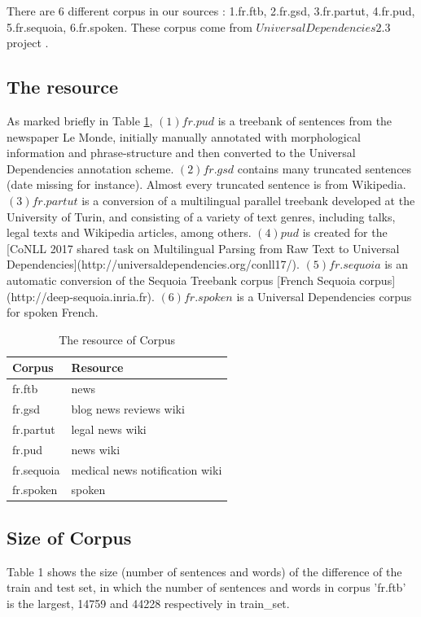 \documentclass{article}
\begin{document}
There are 6 different corpus in our sources : 1.fr.ftb, 2.fr.gsd, 3.fr.partut, 4.fr.pud, 5.fr.sequoia, 6.fr.spoken. These corpus come from $Universal Dependencies 2.3$ project \cite{nivre2017universal}. 

\subsection{The resource}
As marked briefly in Table \ref{table_resource}, $(1) fr.pud$  is a treebank of sentences from the newspaper Le Monde, initially manually annotated with morphological information and phrase-structure and then converted to the Universal Dependencies annotation scheme. $(2) fr.gsd$ contains many truncated sentences (date missing for instance). Almost every truncated sentence is from Wikipedia. $(3) fr.partut$ is a conversion of a multilingual parallel treebank developed at the University of Turin, and consisting of a variety of text genres, including talks, legal texts and Wikipedia articles, among others. $(4) pud$ is created for the [CoNLL 2017 shared task on Multilingual Parsing from Raw Text to Universal Dependencies](http://universaldependencies.org/conll17/). $(5) fr.sequoia$ is an automatic conversion of the Sequoia Treebank corpus [French Sequoia corpus](http://deep-sequoia.inria.fr). $(6) fr.spoken$ is a Universal Dependencies corpus for spoken French.

\begin{table}[h]
\caption{The resource of Corpus}
\vspace{5pt}
\centering
    
\begin{tabular}{|l|l|}
\hline
Corpus & Resource\\
\hline
fr.ftb     & news \\
fr.gsd     & blog news reviews wiki\\
fr.partut  & legal news wiki\\
fr.pud     & news wiki\\
fr.sequoia & medical news notification wiki\\
fr.spoken  & spoken \\
\hline
\end{tabular}
\label{table_resource}
\end{table}


\subsection{Size of Corpus} 
Table 1 shows the size (number of sentences and words) of the difference of the train and test set, in which the number of sentences and words in corpus 'fr.ftb' is the largest, 14759 and 44228 respectively in train\_set. 
\end{document}
